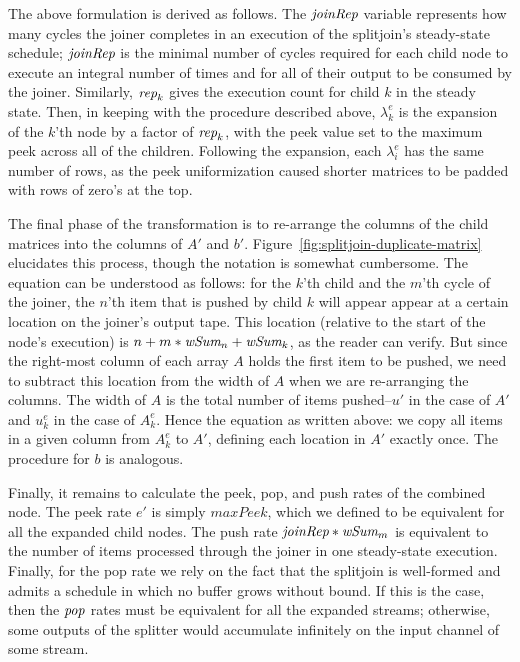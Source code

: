 The above formulation is derived as follows.  The $\mbox{\it joinRep}$
variable represents how many cycles the joiner completes in an
execution of the splitjoin's steady-state schedule; $\mbox{\it joinRep}$ is
the minimal number of cycles required for each child node to execute
an integral number of times and for all of their output to be consumed
by the joiner.  Similarly, $\mbox{\it rep}_k$ gives the execution count for
child $k$ in the steady state.  Then, in keeping with the procedure
described above, $\lambda_k^e$ is the expansion of the $k$'th node by
a factor of $\mbox{\it rep}_k$, with the peek value set to the maximum peek
across all of the children.  Following the expansion, each
$\lambda_i^e$ has the same number of rows, as the peek uniformization
caused shorter matrices to be padded with rows of zero's at the top.

The final phase of the transformation is to re-arrange the columns of
the child matrices into the columns of $A'$ and $b'$.
Figure~\ref{fig:splitjoin-duplicate-matrix} elucidates this process,
though the notation is somewhat cumbersome.  The equation can be
understood as follows: for the $k$'th child and the $m$'th cycle of
the joiner, the $n$'th item that is pushed by child $k$ will appear
appear at a certain location on the joiner's output tape.  This
location (relative to the start of the node's execution) is $n + m *
\mbox{\it wSum}_n + \mbox{\it wSum}_k$, as the reader can verify.  But since the
right-most column of each array $A$ holds the first item to be pushed,
we need to subtract this location from the width of $A$ when we are
re-arranging the columns.  The width of $A$ is the total number of
items pushed--$u'$ in the case of $A'$ and $u_k^e$ in the case of
$A_k^e$.  Hence the equation as written above: we copy all items in a
given column from $A_k^e$ to $A'$, defining each location in $A'$
exactly once.  The procedure for $b$ is analogous.

Finally, it remains to calculate the peek, pop, and push rates of the
combined node.  The peek rate $e'$ is simply $maxPeek$, which we
defined to be equivalent for all the expanded child nodes.  The push
rate $\mbox{\it joinRep}*\mbox{\it wSum}_m$ is equivalent to the number of items
processed through the joiner in one steady-state execution.  Finally,
for the pop rate we rely on the fact that the splitjoin is well-formed
and admits a schedule in which no buffer grows without bound.  If this
is the case, then the $\mbox{\it pop}$ rates must be equivalent for all the
expanded streams; otherwise, some outputs of the splitter would
accumulate infinitely on the input channel of some stream.  

